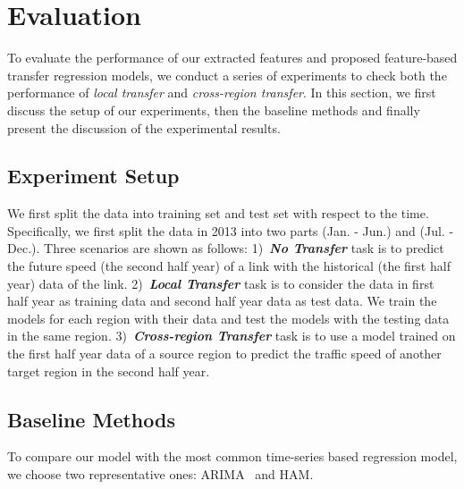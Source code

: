 \section{Evaluation}
To evaluate the performance of our extracted features and proposed feature-based transfer regression models, we conduct a series of experiments to check both the performance of \textit{local transfer} and \textit{cross-region transfer}.
In this section, we first discuss the setup of our experiments, then the baseline methods and finally present the discussion of the experimental results.
\subsection{Experiment Setup}
We first split the data into training set and test set with respect to the time. 
Specifically, we first split the data in 2013 into two parts (Jan. - Jun.) and (Jul. - Dec.).
Three scenarios are shown as follows:
1)~\textit{\textbf{No Transfer}} task is to predict the future speed  (the second half year) of a link with the historical (the first half year) data of the link.		
2)~\textit{\textbf{Local Transfer}} task is to consider the data in first half year as training data and second half year data as test data. 
We train the models for each region with their data and test the models with the testing data in the same region. 
3)~\textit{\textbf{Cross-region Transfer}} task is to use a model trained on the first half year data of a source region to predict the traffic speed of another target region in the second half year.

\subsection{Baseline Methods}
To compare our model with the most common time-series based regression model, we choose two representative ones: ARIMA~\cite{ARIMA} and HAM. 
